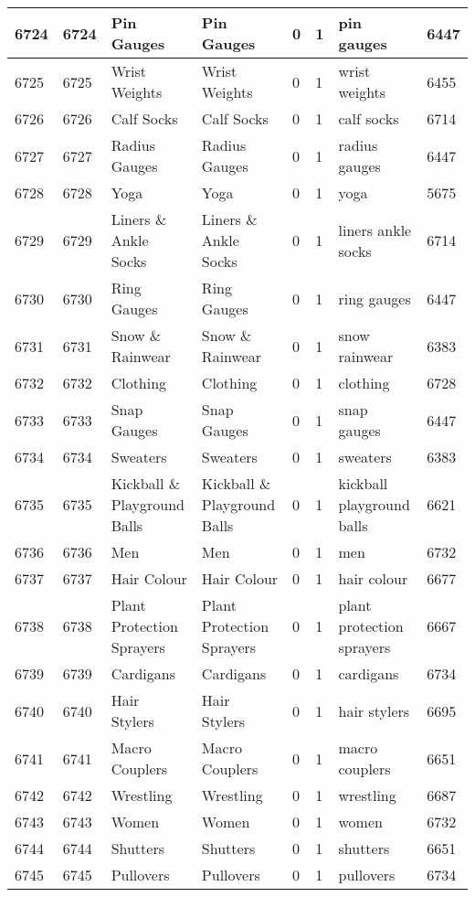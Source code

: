 \begin{longtable}{|l|l|l|l|l|l|l|l|}
6724 & 6724 & Pin Gauges & Pin Gauges & 0 & 1 & pin gauges & 6447 \\ \hline 
6725 & 6725 & Wrist Weights & Wrist Weights & 0 & 1 & wrist weights & 6455 \\ \hline 
6726 & 6726 & Calf Socks & Calf Socks & 0 & 1 & calf socks & 6714 \\ \hline 
6727 & 6727 & Radius Gauges & Radius Gauges & 0 & 1 & radius gauges & 6447 \\ \hline 
6728 & 6728 & Yoga & Yoga & 0 & 1 & yoga & 5675 \\ \hline 
6729 & 6729 & Liners \& Ankle Socks & Liners \& Ankle Socks & 0 & 1 & liners ankle socks & 6714 \\ \hline 
6730 & 6730 & Ring Gauges & Ring Gauges & 0 & 1 & ring gauges & 6447 \\ \hline 
6731 & 6731 & Snow \& Rainwear & Snow \& Rainwear & 0 & 1 & snow rainwear & 6383 \\ \hline 
6732 & 6732 & Clothing & Clothing & 0 & 1 & clothing & 6728 \\ \hline 
6733 & 6733 & Snap Gauges & Snap Gauges & 0 & 1 & snap gauges & 6447 \\ \hline 
6734 & 6734 & Sweaters & Sweaters & 0 & 1 & sweaters & 6383 \\ \hline 
6735 & 6735 & Kickball \& Playground Balls & Kickball \& Playground Balls & 0 & 1 & kickball playground balls & 6621 \\ \hline 
6736 & 6736 & Men & Men & 0 & 1 & men & 6732 \\ \hline 
6737 & 6737 & Hair Colour & Hair Colour & 0 & 1 & hair colour & 6677 \\ \hline 
6738 & 6738 & Plant Protection Sprayers & Plant Protection Sprayers & 0 & 1 & plant protection sprayers & 6667 \\ \hline 
6739 & 6739 & Cardigans & Cardigans & 0 & 1 & cardigans & 6734 \\ \hline 
6740 & 6740 & Hair Stylers & Hair Stylers & 0 & 1 & hair stylers & 6695 \\ \hline 
6741 & 6741 & Macro Couplers & Macro Couplers & 0 & 1 & macro couplers & 6651 \\ \hline 
6742 & 6742 & Wrestling & Wrestling & 0 & 1 & wrestling & 6687 \\ \hline 
6743 & 6743 & Women & Women & 0 & 1 & women & 6732 \\ \hline 
6744 & 6744 & Shutters & Shutters & 0 & 1 & shutters & 6651 \\ \hline 
6745 & 6745 & Pullovers & Pullovers & 0 & 1 & pullovers & 6734 \\ \hline 

\end{longtable}
